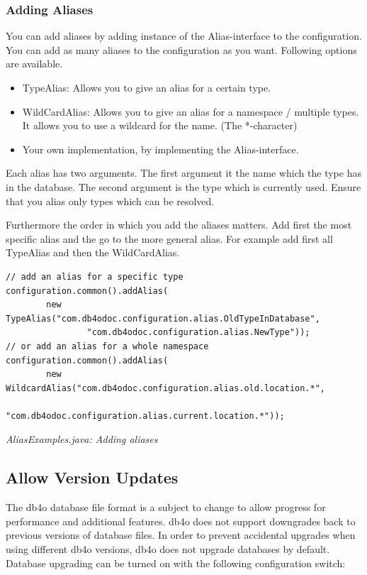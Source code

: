 \subsubsection*{Adding Aliases}

You can add aliases by adding instance of the Alias-interface to the configuration. You can add as many aliases to the configuration as you want. Following options are available.

\begin{itemize}
\item TypeAlias: Allows you to give an alias for a certain type.
\item WildCardAlias: Allows you to give an alias for a namespace / multiple types. It allows you to use a wildcard for the name. (The *-character)
\item Your own implementation, by implementing the Alias-interface.
\end{itemize}

Each alias has two arguments. The first argument it the name which the type has in the database. The second argument is the type which is currently used. Ensure that you alias only types which can be resolved.

Furthermore the order in which you add the aliases matters. Add first the most specific alias and the go to the more general alias. For example add first all TypeAlias and then the WildCardAlias.

\begin{lstlisting}
// add an alias for a specific type
configuration.common().addAlias(
        new TypeAlias("com.db4odoc.configuration.alias.OldTypeInDatabase",
                "com.db4odoc.configuration.alias.NewType"));
// or add an alias for a whole namespace
configuration.common().addAlias(
        new WildcardAlias("com.db4odoc.configuration.alias.old.location.*",
                "com.db4odoc.configuration.alias.current.location.*"));
\end{lstlisting}

{\small\itshape AliasExamples.java: Adding aliases\par}
\medskip

\subsection{Allow Version Updates}
\label{ref:configuration-common-updating-db4o-file-format}

The db4o database file format is a subject to change to allow progress for performance and additional features. db4o does not support downgrades back to previous versions of database files. In order to prevent accidental upgrades when using different db4o versions, db4o does not upgrade databases by default. Database upgrading can be turned on with the following configuration switch:

